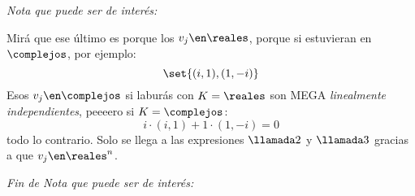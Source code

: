 \begin{itemize}
        \bigskip

        \textit{Nota que puede ser de interés:}

        Mirá que ese último \red{!!} es porque los $v_j \en \reales$, porque si estuvieran en $\complejos$, por ejemplo:
        $$
          \set{(i,1), (1,-i)}
        $$
        Esos $v_j \en \complejos$ si laburás con $K = \reales$ son {\large{MEGA}} \textit{linealmente independientes},
        peeeero si $K = \complejos$:
        $$
          i \cdot (i, 1) + 1 \cdot (1,-i) = 0
        $$
        todo lo contrario. Solo se llega a las expresiones $\llamada2$ y $\llamada3$ gracias a que $v_j \en \reales^n$.

        \textit{Fin de Nota que puede ser de interés:}
\end{itemize}

\begin{aportes}
  \item {}
\end{aportes}
